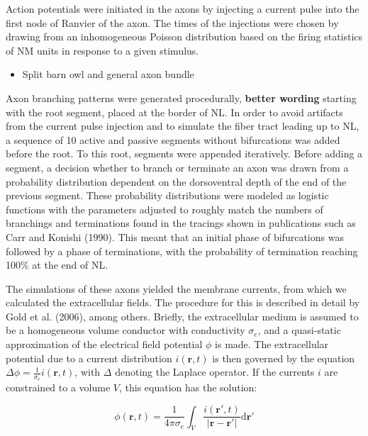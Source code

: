 \documentclass[]{article}
\providecommand{\tightlist}{%
  \setlength{\itemsep}{0pt}\setlength{\parskip}{0pt}}
\begin{document}
Action potentials were initiated in the axons by injecting a current
pulse into the first node of Ranvier of the axon. The times of the
injections were chosen by drawing from an inhomogeneous Poisson
distribution based on the firing statistics of NM units in response to a
given stimulus.

\begin{itemize}
\tightlist
\item
  Split barn owl and general axon bundle
\end{itemize}

Axon branching patterns were generated procedurally, \textbf{better
wording} starting with the root segment, placed at the border of NL. In
order to avoid artifacts from the current pulse injection and to
simulate the fiber tract leading up to NL, a sequence of 10 active and
passive segments without bifurcations was added before the root. To this
root, segments were appended iteratively. Before adding a segment, a
decision whether to branch or terminate an axon was drawn from a
probability distribution dependent on the dorsoventral depth of the end
of the previous segment. These probability distributions were modeled as
logistic functions with the parameters adjusted to roughly match the
numbers of branchings and terminations found in the tracings shown in
publications such as Carr and Konishi (1990). This meant that an initial
phase of bifurcations was followed by a phase of terminations, with the
probability of termination reaching 100\% at the end of NL.

The simulations of these axons yielded the membrane currents, from which
we calculated the extracellular fields. The procedure for this is
described in detail by Gold et al. (2006), among others. Briefly, the
extracellular medium is assumed to be a homogeneous volume conductor
with conductivity \(\sigma_e\), and a quasi-static approximation of the
electrical field potential \(\phi\) is made. The extracellular potential
due to a current distribution \(i(\mathbf{r},t)\) is then governed by
the equation \(\Delta \phi = \frac{1}{\sigma_e} i(\mathbf{r},t)\), with
\(\Delta\) denoting the Laplace operator. If the currents \(i\) are
constrained to a volume \(V\), this equation has the solution:

\begin{equation}
  \phi(\mathbf{r},t)=\frac{1}{4\pi\sigma_{e}}\int_{V}\frac{i(\mathbf{r}',t)}{|\mathbf{r}-\mathbf{r}'|}\textrm{d}\mathbf{r}'
  \label{eqn:basic}
\end{equation}
\end{document}
